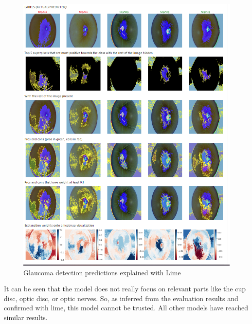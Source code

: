 \documentclass[11pt, a4paper]{article}
\begin{document}
\begin{figure}[H]
	\centering
	\includegraphics[width=15cm]{imgs/general/Glaucoma detection predictions explained with Lime.PNG}
	\caption{Glaucoma detection predictions explained with Lime}
	 \label{fig:Glaucoma detection predictions explained with Lime}
\end{figure}
\noindent It can be seen that the model does not really focus on relevant parts like the cup disc, optic disc, or optic nerves. So, as inferred from the evaluation results and confirmed with lime, this model cannot be trusted. All other models have reached similar results.
\end{document}
